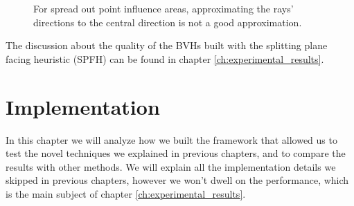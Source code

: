 \documentclass{PoliMi_MasterThesis}
\begin{document}
\begin{figure}[H]
    \centering
	\qquad
		\caption{For spread out point influence areas, approximating the rays' directions to the central direction is not a good approximation.}
		\label{fig:point_influence_areas_central_dir_approx}
\end{figure}
	
The discussion about the quality of the BVHs built with the splitting plane facing heuristic (SPFH) can be found in chapter \ref{ch:experimental_results}.

\chapter{Implementation} \label{ch:implementation}
In this chapter we will analyze how we built the framework that allowed us to test the novel techniques we explained in previous chapters, and to compare the results with other methods.
We will explain all the implementation details we skipped in previous chapters, however we won't dwell on the performance, which is the main subject of chapter \ref{ch:experimental_results}.
\end{document}
